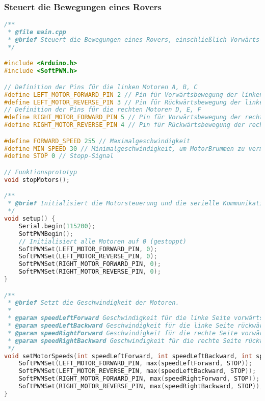\documentclass{vorlage-design-main}
\begin{document}
\newpage

\hypertarget{steuert-die-bewegungen-eines-rovers}{%
\subsubsection{Steuert die Bewegungen eines
Rovers}\label{steuert-die-bewegungen-eines-rovers}}

\begin{lstlisting}[language={C++}]
/**
 * @file main.cpp
 * @brief Steuert die Bewegungen eines Rovers, einschließlich Vorwärts-, Rückwärtsbewegungen und Drehungen.
 */

#include <Arduino.h>
#include <SoftPWM.h>

// Definition der Pins für die linken Motoren A, B, C
#define LEFT_MOTOR_FORWARD_PIN 2 // Pin für Vorwärtsbewegung der linken Motoren (A, B, C)
#define LEFT_MOTOR_REVERSE_PIN 3 // Pin für Rückwärtsbewegung der linken Motoren (A, B, C)
// Definition der Pins für die rechten Motoren D, E, F
#define RIGHT_MOTOR_FORWARD_PIN 5 // Pin für Vorwärtsbewegung der rechten Motoren (D, E, F)
#define RIGHT_MOTOR_REVERSE_PIN 4 // Pin für Rückwärtsbewegung der rechten Motoren (D, E, F)

#define FORWARD_SPEED 255 // Maximalgeschwindigkeit
#define MIN_SPEED 30 // Minimalgeschwindigkeit, um MotorBrummen zu vermeiden
#define STOP 0 // Stopp-Signal

// Funktionsprototyp
void stopMotors(); 

/**
 * @brief Initialisiert die Motorsteuerung und die serielle Kommunikation.
 */
void setup() {
    Serial.begin(115200);
    SoftPWMBegin();
    // Initialisiert alle Motoren auf 0 (gestoppt)
    SoftPWMSet(LEFT_MOTOR_FORWARD_PIN, 0);
    SoftPWMSet(LEFT_MOTOR_REVERSE_PIN, 0);
    SoftPWMSet(RIGHT_MOTOR_FORWARD_PIN, 0);
    SoftPWMSet(RIGHT_MOTOR_REVERSE_PIN, 0);
}

/**
 * @brief Setzt die Geschwindigkeit der Motoren.
 * 
 * @param speedLeftForward Geschwindigkeit für die linke Seite vorwärts.
 * @param speedLeftBackward Geschwindigkeit für die linke Seite rückwärts.
 * @param speedRightForward Geschwindigkeit für die rechte Seite vorwärts.
 * @param speedRightBackward Geschwindigkeit für die rechte Seite rückwärts.
 */
void setMotorSpeeds(int speedLeftForward, int speedLeftBackward, int speedRightForward, int speedRightBackward) {
    SoftPWMSet(LEFT_MOTOR_FORWARD_PIN, max(speedLeftForward, STOP));
    SoftPWMSet(LEFT_MOTOR_REVERSE_PIN, max(speedLeftBackward, STOP));
    SoftPWMSet(RIGHT_MOTOR_FORWARD_PIN, max(speedRightForward, STOP));
    SoftPWMSet(RIGHT_MOTOR_REVERSE_PIN, max(speedRightBackward, STOP));
}


\end{lstlisting}
\end{document}
